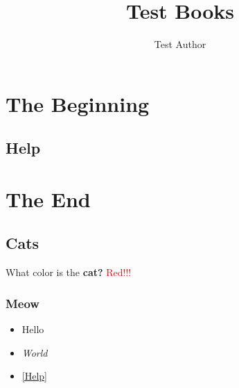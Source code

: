 \documentclass[12pt, openany]{book}
\begin{document}
\title{Test Books}
\author{Test Author}
\date{ }
\maketitle
\tableofcontents
\part{The Beginning}
\chapter{Help}
\label{Help}
\part{The End}
\chapter{Cats}
What color is the \textbf{cat?}
\textcolor{red}{Red!!!}
\section{Meow}
\begin{itemize}
\item{Hello}
\item{\textit{World}}
\item{\autoref{Help}}
\end{itemize}
\end{document}
